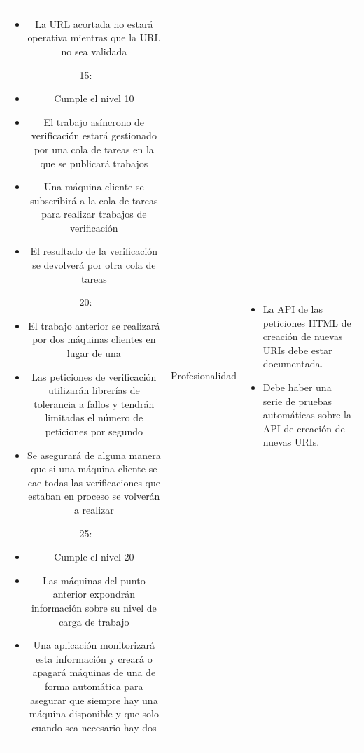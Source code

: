 \documentclass{article}
\begin{document}
\begin{table}[hbtp]
\begin{tabulary}{\textwidth}{ C L }
\begin{itemize}
        \item La URL acortada no estará operativa mientras que la URL no sea
        validada
    \end{itemize} 
    15:
    \begin{itemize}
        \item Cumple el nivel 10
        
        \item El trabajo asíncrono de verificación estará gestionado por una
        cola de tareas en la que se publicará trabajos
        
        \item Una máquina cliente se subscribirá a la cola de tareas para
        realizar trabajos de verificación
        
        \item El resultado de la verificación se devolverá por otra cola de
        tareas
 
 
	\end{itemize} 
    20:
    \begin{itemize}
        \item El trabajo anterior se realizará por dos máquinas clientes en
        lugar de una
        
        \item Las peticiones de verificación utilizarán librerías de tolerancia a
        fallos y tendrán limitadas el número de peticiones por segundo
        
        \item Se asegurará de alguna manera que si una máquina cliente se
        cae todas las verificaciones que estaban en proceso se volverán
        a realizar
	\end{itemize}
    25:
    \begin{itemize}
        \item Cumple el nivel 20
        
        \item Las máquinas del punto anterior expondrán información sobre
        su nivel de carga de trabajo
 
        \item Una aplicación monitorizará esta información y creará o apagará
        máquinas de una de forma automática para asegurar que
        siempre hay una máquina disponible y que solo cuando sea
        necesario hay dos
	\end{itemize} &
 
    Profesionalidad & 
    \begin{itemize}
        \item La API de las peticiones HTML de creación de nuevas URIs debe estar documentada.
	    \item Debe haber una serie de pruebas automáticas sobre la API de creación de nuevas URIs.
    \end{itemize}
 
    \end{tabulary}
\end{table}
 
\end{document}
